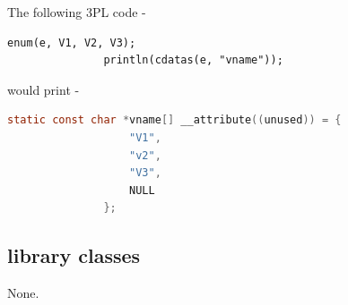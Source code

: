             The following 3PL code -
            \begin{lstlisting}[gobble=12, language=threepl]
               enum(e, V1, V2, V3);
               println(cdatas(e, "vname"));
            \end{lstlisting}
            would print -

            \begin{lstlisting}[gobble=12, language=C]
               static const char *vname[] __attribute((unused)) = {
                   "V1",
                   "v2",
                   "V3",
                   NULL
               };
            \end{lstlisting}



    \subsection{library classes}
    
        None.
